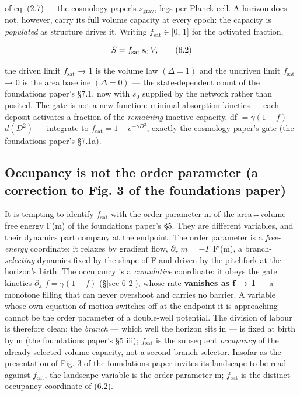 \documentclass[aps,prd,preprint,nofootinbib,superscriptaddress]{revtex4-2}
\begin{document}
of eq. (2.7) --- the cosmology paper's \(s_{\mathrm{grav}}\), legs per
Planck cell. A horizon does not, however, carry its full volume capacity
at every epoch: the capacity is \emph{populated} as structure drives it.
Writing \(f_{\mathrm{sat}} \in  [0\), 1{]} for the activated fraction,

\begin{equation}S = f_{\rm sat}\, s_0\, V, \tag{6.2}\end{equation}

the driven limit \(f_{\mathrm{sat}}\) → 1 is the volume law
\((\Delta  = 1)\) and the undriven limit \(f_{\mathrm{sat}}\) → 0 is the
area baseline \((\Delta  = 0)\) --- the state-dependent count of the
foundations paper's §7.1, now with \(s_{0}\) supplied by the network
rather than posited. The gate is not a new function: minimal absorption
kinetics --- each deposit activates a fraction of the \emph{remaining}
inactive capacity, df \(= \gamma (1 - f)\) \(d(D^{2})\) --- integrate to
\(f_{\mathrm{sat}} = 1 - e^{-\gamma  D^{2}}\), exactly the cosmology
paper's gate (the foundations paper's §7.1a).

\subsection{Occupancy is not the order parameter (a correction to Fig. 3
of the foundations paper)}\label{sec-6-3}

It is tempting to identify \(f_{\mathrm{sat}}\) with the order parameter
m of the area↔volume free energy F(m) of the foundations paper's §5.
They are different variables, and their dynamics part company at the
endpoint. The order parameter is a \emph{free-energy} coordinate: it
relaxes by gradient flow, \(\partial _\tau\) \(m = -\Gamma\) F′(m), a
branch-\emph{selecting} dynamics fixed by the shape of F and driven by
the pitchfork at the horizon's birth. The occupancy is a
\emph{cumulative} coordinate: it obeys the gate kinetics
\(\partial _{\mathrm{x}}\) \(f = \gamma (1 - f)\) (§\ref{sec-6-2}),
whose rate \textbf{vanishes as f → 1} --- a monotone filling that can
never overshoot and carries no barrier. A variable whose own equation of
motion switches off at the endpoint it is approaching cannot be the
order parameter of a double-well potential. The division of labour is
therefore clean: the \emph{branch} --- which well the horizon sits in
--- is fixed at birth by m (the foundations paper's §5 iii);
\(f_{\mathrm{sat}}\) is the subsequent \emph{occupancy} of the
already-selected volume capacity, not a second branch selector. Insofar
as the presentation of Fig. 3 of the foundations paper invites its
landscape to be read against \(f_{\mathrm{sat}}\), the landscape
variable is the order parameter m; \(f_{\mathrm{sat}}\) is the distinct
occupancy coordinate of (6.2).
\end{document}
